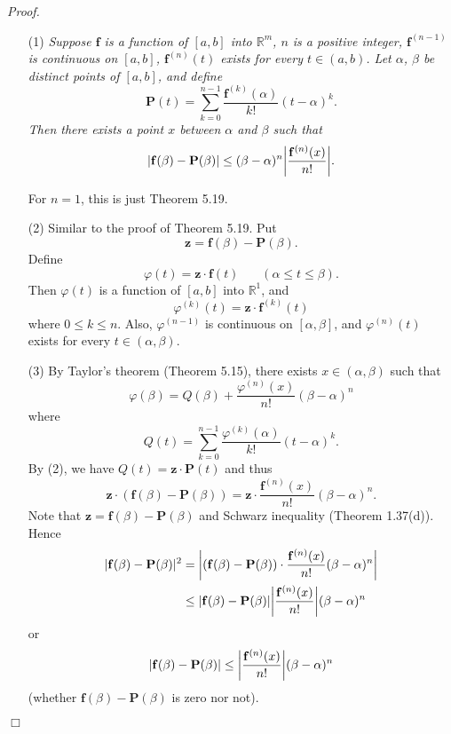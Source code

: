 \documentclass{article}
\begin{document}
\emph{Proof.}
\begin{enumerate}
  \item[(1)]
  \emph{Suppose $\mathbf{f}$ is a function of $[a,b]$ into $\mathbb{R}^{m}$,
  $n$ is a positive integer,
  $\mathbf{f}^{(n-1)}$ is continuous on $[a,b]$,
  $\mathbf{f}^{(n)}(t)$ exists for every $t \in (a,b)$.
  Let $\alpha$, $\beta$ be distinct points of $[a,b]$, and define
  \[
    \mathbf{P}(t) = \sum_{k=0}^{n-1} \frac{\mathbf{f}^{(k)}(\alpha)}{k!}(t - \alpha)^k.
  \]
  Then there exists a point $x$ between $\alpha$ and $\beta$ such that}
  \[
    \abs{ \mathbf{f}(\beta) - \mathbf{P}(\beta) }
    \leq (\beta - \alpha)^n \abs{\frac{\mathbf{f}^{(n)}(x)}{n!}}.
  \]

  For $n = 1$, this is just Theorem 5.19.

  \item[(2)]
  Similar to the proof of Theorem 5.19.
  Put
  \[
    \mathbf{z} = \mathbf{f}(\beta) - \mathbf{P}(\beta).
  \]
  Define
  \[
    \varphi(t) = \mathbf{z} \cdot \mathbf{f}(t)
    \:\:\:\:\:\:\:\: (\alpha \leq t \leq \beta).
  \]
  Then $\varphi(t)$ is a function of $[a,b]$ into $\mathbb{R}^1$, and
  \[
    \varphi^{(k)}(t) = \mathbf{z} \cdot \mathbf{f}^{(k)}(t)
  \]
  where $0 \leq k \leq n$.
  Also, $\varphi^{(n-1)}$ is continuous on $[\alpha,\beta]$,
  and $\varphi^{(n)}(t)$ exists for every $t \in (\alpha,\beta)$.

  \item[(3)]
  By Taylor's theorem (Theorem 5.15), there exists $x \in (\alpha,\beta)$ such that
  \[
    \varphi(\beta) = Q(\beta) + \frac{\varphi^{(n)}(x)}{n!}(\beta-\alpha)^n
  \]
  where
  \[
    Q(t) = \sum_{k=0}^{n-1} \frac{\varphi^{(k)}(\alpha)}{k!}(t - \alpha)^k.
  \]
  By (2), we have $Q(t) = \mathbf{z} \cdot \mathbf{P}(t)$ and thus
  \[
    \mathbf{z} \cdot (\mathbf{f}(\beta) - \mathbf{P}(\beta))
    = \mathbf{z} \cdot \frac{\mathbf{f}^{(n)}(x)}{n!}(\beta-\alpha)^n.
  \]
  Note that $\mathbf{z} = \mathbf{f}(\beta) - \mathbf{P}(\beta)$
  and Schwarz inequality (Theorem 1.37(d)).
  Hence
  \begin{align*}
    |\mathbf{f}(\beta) - \mathbf{P}(\beta)|^2
    &=
    \abs{ (\mathbf{f}(\beta) - \mathbf{P}(\beta))
      \cdot \frac{\mathbf{f}^{(n)}(x)}{n!}(\beta-\alpha)^n } \\
    &\leq
      \abs{ \mathbf{f}(\beta) - \mathbf{P}(\beta) }
      \abs{ \frac{\mathbf{f}^{(n)}(x)}{n!} } (\beta-\alpha)^n
  \end{align*}
  or
  \[
    |\mathbf{f}(\beta) - \mathbf{P}(\beta)|
    \leq \abs{ \frac{\mathbf{f}^{(n)}(x)}{n!} } (\beta-\alpha)^n
  \]
  (whether $\mathbf{f}(\beta) - \mathbf{P}(\beta)$ is zero nor not).
\end{enumerate}
$\Box$ \\\\
\end{document}
